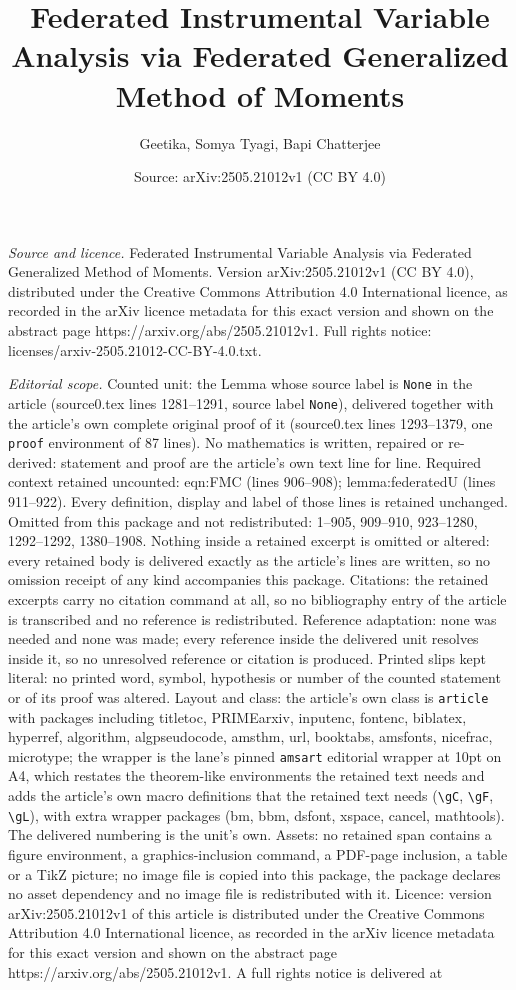 \documentclass[10pt,a4paper]{amsart}
\title[Federated Instrumental Variable Analysis via Federated Gener]{Federated Instrumental Variable Analysis via Federated Generalized Method of Moments}
\author{Geetika, Somya Tyagi, Bapi Chatterjee}
\date{Source: arXiv:2505.21012v1 (CC BY 4.0)}
\begin{document}
\maketitle

\noindent\emph{Source and licence.} Federated Instrumental Variable Analysis via Federated Generalized Method of Moments. Version arXiv:2505.21012v1 (CC BY 4.0), distributed under the Creative Commons Attribution 4.0 International licence, as recorded in the arXiv licence metadata for this exact version and shown on the abstract page https://arxiv.org/abs/2505.21012v1. Full rights notice: licenses/arxiv-2505.21012-CC-BY-4.0.txt.\par\smallskip

\noindent\textit{Editorial scope.} Counted unit: the Lemma whose source label is \texttt{None} in the article (source0.tex lines 1281--1291, source label \texttt{None}), delivered together with the article's own complete original proof of it (source0.tex lines 1293--1379, one \texttt{proof} environment of 87 lines). No mathematics is written, repaired or re-derived: statement and proof are the article's own text line for line. Required context retained uncounted: eqn:FMC (lines 906--908); lemma:federatedU (lines 911--922). Every definition, display and label of those lines is retained unchanged. Omitted from this package and not redistributed: 1--905, 909--910, 923--1280, 1292--1292, 1380--1908. Nothing inside a retained excerpt is omitted or altered: every retained body is delivered exactly as the article's lines are written, so no omission receipt of any kind accompanies this package. Citations: the retained excerpts carry no citation command at all, so no bibliography entry of the article is transcribed and no reference is redistributed. Reference adaptation: none was needed and none was made; every reference inside the delivered unit resolves inside it, so no unresolved reference or citation is produced. Printed slips kept literal: no printed word, symbol, hypothesis or number of the counted statement or of its proof was altered. Layout and class: the article's own class is \texttt{article} with packages including titletoc, PRIMEarxiv, inputenc, fontenc, biblatex, hyperref, algorithm, algpseudocode, amsthm, url, booktabs, amsfonts, nicefrac, microtype; the wrapper is the lane's pinned \texttt{amsart} editorial wrapper at 10pt on A4, which restates the theorem-like environments the retained text needs and adds the article's own macro definitions that the retained text needs (\texttt{\textbackslash gC}, \texttt{\textbackslash gF}, \texttt{\textbackslash gL}), with extra wrapper packages (bm, bbm, dsfont, xspace, cancel, mathtools). The delivered numbering is the unit's own. Assets: no retained span contains a figure environment, a graphics-inclusion command, a PDF-page inclusion, a table or a TikZ picture; no image file is copied into this package, the package declares no asset dependency and no image file is redistributed with it. Licence: version arXiv:2505.21012v1 of this article is distributed under the Creative Commons Attribution 4.0 International licence, as recorded in the arXiv licence metadata for this exact version and shown on the abstract page https://arxiv.org/abs/2505.21012v1. A full rights notice is delivered at 
\end{document}
